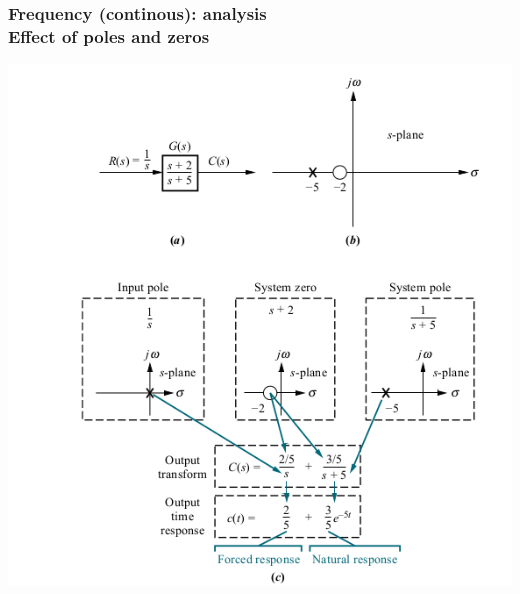 \documentclass[hyperref={pdfpagelabels=true}]{beamer}
\begin{document}
\begin{frame}
\frametitle{Frequency (continous): analysis \\ {\large Effect of poles and zeros}}
\centering
\includegraphics[scale = .38]{figs/Selection_032.png} 
\end{frame}
\end{document}
